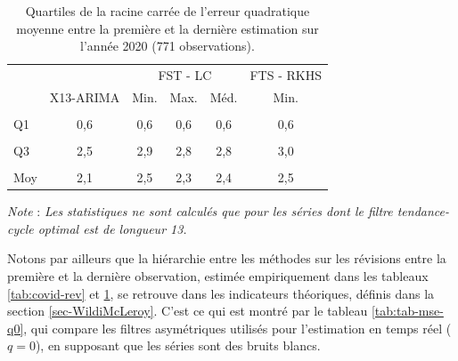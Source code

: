 \documentclass[
  11pt,
  french,
  a4paper]{article}
\newcommand\1{\mathds{1}}
\begin{document}
\begin{table}[!h]

\caption{\label{tab:covid-rev-fst}Quartiles de la racine carrée de l'erreur quadratique moyenne entre la première et la dernière estimation sur l'année 2020 (771 observations).}
\centering
\begin{tabular}[t]{lccccc}
\toprule
\multicolumn{2}{c}{ } & \multicolumn{3}{c}{FST - LC} & \multicolumn{1}{c}{FTS - RKHS} \\
\cmidrule(l{3pt}r{3pt}){3-5} \cmidrule(l{3pt}r{3pt}){6-6}
  & X13-ARIMA & Min. & Max. & Méd. & Min.\\
\midrule
\cellcolor{gray!6}{Min} & \cellcolor{gray!6}{0,1} & \cellcolor{gray!6}{0,1} & \cellcolor{gray!6}{0,1} & \cellcolor{gray!6}{0,1} & \cellcolor{gray!6}{0,1}\\
Q1 & 0,6 & 0,6 & 0,6 & 0,6 & 0,6\\
\cellcolor{gray!6}{Méd.} & \cellcolor{gray!6}{1,1} & \cellcolor{gray!6}{1,3} & \cellcolor{gray!6}{1,2} & \cellcolor{gray!6}{1,3} & \cellcolor{gray!6}{1,3}\\
Q3 & 2,5 & 2,9 & 2,8 & 2,8 & 3,0\\
\cellcolor{gray!6}{Max} & \cellcolor{gray!6}{25,0} & \cellcolor{gray!6}{31,5} & \cellcolor{gray!6}{30,2} & \cellcolor{gray!6}{29,8} & \cellcolor{gray!6}{31,9}\\
\addlinespace
Moy & 2,1 & 2,5 & 2,3 & 2,4 & 2,5\\
\bottomrule
\end{tabular}
\footnotesize


\emph{Note} : \emph{Les statistiques ne sont calculés que pour les séries dont le filtre tendance-cycle optimal est de longueur 13.}
\normalsize\end{table}

Notons par ailleurs que la hiérarchie entre les méthodes sur les révisions entre la première et la dernière observation, estimée empiriquement dans les tableaux \ref{tab:covid-rev} et \ref{tab:covid-rev-fst}, se retrouve dans les indicateurs théoriques, définis dans la section \ref{sec-WildiMcLeroy}. C'est ce qui est montré par le tableau \ref{tab:tab-mse-q0}, qui compare les filtres asymétriques utilisés pour l'estimation en temps réel (\(q=0\)), en supposant que les séries sont des bruits blancs.
\end{document}
